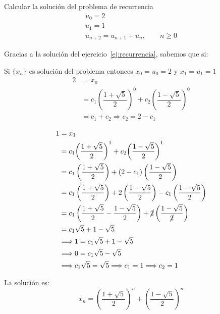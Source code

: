 \begin{ejercicio}
    Calcular la solución del problema de recurrencia 
    \begin{gather*}
        u_0 = 2 \\
        u_1 = 1 \\
        u_{n+2} = u_{n+1} + u_n,\qquad n\geq 0
    \end{gather*}

    Gracias a la solución del ejercicio~\ref{ej:recurrencia}, sabemos que si:

    Si $\{x_n\}$ es solución del problema entonces $x_0 = u_0 = 2$ y $x_1 = u_1 = 1$
    \begin{align*}
        2 &= x_0 \\
          &= c_1{\left(\dfrac{1+\sqrt{5}}{2}\right)}^0 + c_2 {\left(\dfrac{1-\sqrt{5}}{2}\right)}^0\\
          &= c_1 + c_2 \Longrightarrow c_2 = 2-c_1
    \end{align*}

    \begin{align*}
        1 &= x_1 \\
          &= c_1 {\left(\dfrac{1+\sqrt{5}}{2}\right)}^1 + c_2 {\left(\dfrac{1-\sqrt{5}}{2}\right)}^1 \\
          &= c_1 \left(\dfrac{1+\sqrt{5}}{2}\right) + (2- c_1) \left(\dfrac{1-\sqrt{5}}{2}\right) \\
          &= c_1 \left(\dfrac{1+\sqrt{5}}{2}\right) + 2 \left(\dfrac{1-\sqrt{5}}{2}\right)-c_1\left(\dfrac{1-\sqrt{5}}{2}\right) \\
          &= c_1 \left(\dfrac{1+\sqrt{5}}{2}-\dfrac{1-\sqrt{5}}{2}\right) + \cancel{2}\left(\dfrac{1-\sqrt{5}}{\cancel{2}}\right) \\
          &= c_1 \sqrt{5} +1 - \sqrt{5} \\
          &\Longrightarrow 1 = c_1 \sqrt{5} + 1 -\sqrt{5}\\
          &\Longrightarrow 0 = c_1\sqrt{5}-\sqrt{5} \\
          &\Longrightarrow c_1\sqrt{5} = \sqrt{5} \Longrightarrow c_1 = 1 \Longrightarrow c_2 = 1
    \end{align*}

    La solución es:
    \begin{equation*}
        x_n = {\left(\dfrac{1+\sqrt{5}}{2}\right)}^n + {\left(\dfrac{1-\sqrt{5}}{2}\right)}^n
    \end{equation*}
\end{ejercicio}

